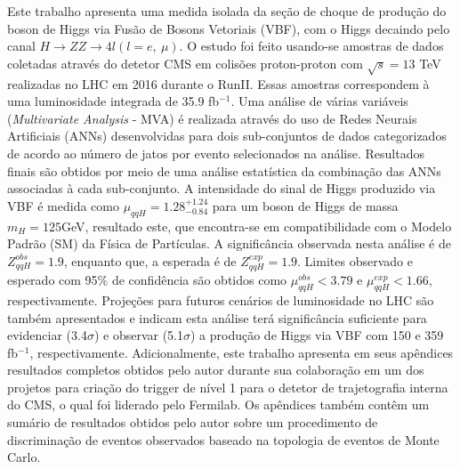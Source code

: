\documentclass[a4paper,12pt,oneside,onecolumn,final,fleqn]{repUERJ}
\begin{document}
Este trabalho apresenta uma medida isolada da seção de choque de produção do boson de Higgs via Fusão de Bosons Vetoriais (VBF), com o Higgs decaindo pelo canal $H \rightarrow ZZ \rightarrow 4l (l=e,~\mu)$. O estudo foi feito usando-se amostras de dados coletadas através do detetor CMS em colisões proton-proton com $\sqrt{s} = 13$ TeV realizadas no LHC em 2016 durante o RunII. Essas amostras correspondem à uma luminosidade integrada de 35.9 fb$^{-1}$. Uma análise de várias variáveis (\textit{Multivariate Analysis} - MVA) é realizada através do uso de Redes Neurais Artificiais (ANNs) desenvolvidas para dois sub-conjuntos de dados categorizados de acordo ao número de jatos por evento selecionados na análise. Resultados finais são obtidos por meio de uma análise estatística da combinação das ANNs associadas à cada sub-conjunto. A intensidade do sinal de Higgs produzido via VBF é medida como $\mu_{qqH} = 1.28^{+1.24}_{-0.84}$ para um boson de Higgs de massa $m_{H} = 125$GeV, resultado este, que encontra-se em compatibilidade com o Modelo Padrão (SM) da Física de Partículas. A significância observada nesta análise é de $Z_{qqH}^{obs} = 1.9$, enquanto que, a esperada é de $Z_{qqH}^{exp} = 1.9$. Limites observado e esperado com 95$\%$ de confidência são obtidos como $\mu_{qqH}^{obs} < 3.79$ e $\mu_{qqH}^{exp} < 1.66$, respectivamente. Projeções para futuros cenários de luminosidade no LHC são também apresentados e indicam esta análise terá significância suficiente para evidenciar (3.4$\sigma$) e observar (5.1$\sigma$) a produção de Higgs via VBF com 150 e 359 fb$^{-1}$, respectivamente. Adicionalmente, este trabalho apresenta em seus apêndices resultados completos obtidos pelo autor durante sua colaboração em um dos projetos para criação do trigger de nível 1 para o detetor de trajetografia interna do CMS, o qual foi liderado pelo Fermilab. Os apêndices também contêm um sumário de resultados obtidos pelo autor sobre um procedimento de discriminação de eventos observados baseado na topologia de eventos de Monte Carlo.

\imprimirchaves %
\end{document}
